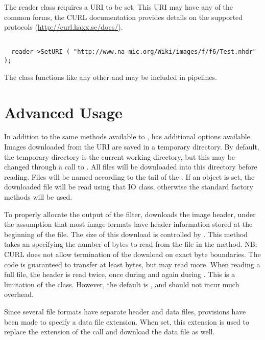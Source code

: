 \documentclass{InsightArticle}
\begin{document}
The reader class requires a URI to be set.  This URI may have any of the common forms, the CURL documentation provides details on the supported protocols (\url{http://curl.haxx.se/docs/}).

\begin{verbatim}
  
  reader->SetURI ( "http://www.na-mic.org/Wiki/images/f/f6/Test.nhdr" );

\end{verbatim}

The class functions like any other  and may be included in pipelines.

\section{Advanced Usage}

In addition to the same methods available to ,  has additional options available.  Images downloaded from the URI are saved in a temporary directory.  By default, the temporary directory is the current working directory, but this may be changed through a call to .  All files will be downloaded into this directory before reading.  Files will be named according to the tail of the .  If an  object is set, the downloaded file will be read using that IO class, otherwise the standard  factory methods will be used.

To properly allocate the output of the filter,  downloads the image header, under the assumption that most image formats have header information stored at the beginning of the file.  The size of this download is controlled by .  This method takes an  specifying the number of bytes to read from the file in the  method.  NB: CURL does not allow termination of the download on exact byte boundaries.  The code is guaranteed to transfer at least  bytes, but may read more.  When reading a full file, the header is read twice, once during  and again during .  This is a limitation of the class.  However, the default  is , and should not incur much overhead.

Since several file formats have separate header and data files, provisions have been made to specify a data file extension.  When set, this extension is used to replace the extension of the  call and download the data file as well.
\end{document}
